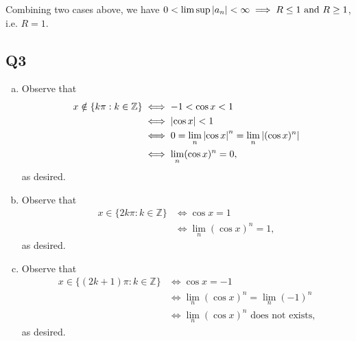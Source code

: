 \documentclass[12pt,lettersize]{article}
\newcommand{\Z}{\mathbb{Z}}
\begin{document}
	Combining two cases above, we have $0<\lim\sup\abs{a_n}<\infty\implies R\leq 1\text{ and }R\geq 1$, i.e. $R=1$.
	\newpage
	
	\subsection*{Q3}
	\begin{enumerate}[(a)]
		\item Observe that
		\begin{align*}
			x\notin\{k\pi:k\in\Z\} &\iff -1<\cos x<1\\ &\iff \abs{\cos x}<1\\ &\iff 0=\lim_n\abs{\cos x}^n=\lim_n\abs{(\cos x)^n}\\ &\iff \lim_n(\cos x)^n=0,
		\end{align*}
		as desired.
		
		\item Observe that
		\begin{align*}
			x\in\{2k\pi: k\in\Z\} &\iff \cos x=1\\ &\iff \lim_n(\cos x)^n=1,
		\end{align*}
		as desired.
		
		\item Observe that
		\begin{align*}
			x\in\{(2k+1)\pi: k\in\Z\} &\iff \cos x=-1\\ &\iff \lim_n(\cos x)^n=\lim_n(-1)^n\\ &\iff \lim_n(\cos x)^n\text{ does not exists,}
		\end{align*}
		as desired.
	\end{enumerate}
	\newpage
	
\end{document}
